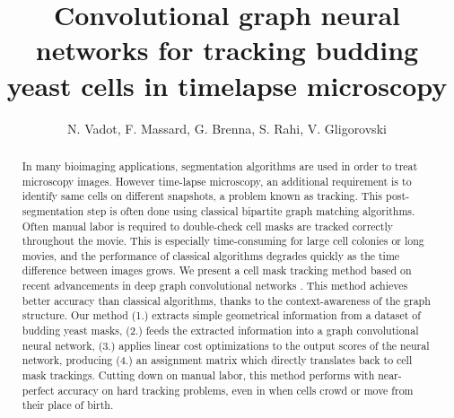 \documentclass[10pt,conference,compsocconf,a4paper]{IEEEtran}
\begin{document}
\title{Convolutional graph neural networks for tracking budding yeast cells in timelapse microscopy}

\author{
	N. Vadot, F. Massard, G. Brenna, S. Rahi, V. Gligorovski
}

\maketitle

\begin{abstract}
	In many bioimaging applications, segmentation algorithms are used in order to treat microscopy images.
	However time-lapse microscopy, an additional requirement is to identify same cells on different snapshots, a problem known as tracking.
	This post-segmentation step is often done using classical bipartite graph matching algorithms.
	Often manual labor is required to double-check cell masks are tracked correctly throughout the movie. This is especially time-consuming for large cell colonies or long movies, and the performance of classical algorithms degrades quickly as the time difference between images grows.
	We present a cell mask tracking method based on recent advancements in deep graph convolutional networks \cite{li_deepergcn_2020}. This method achieves better accuracy than classical algorithms, thanks to the context-awareness of the graph structure. Our method (1.) extracts simple geometrical information from a dataset of budding yeast masks, 
	(2.) feeds the extracted information into a graph convolutional neural network, 
	(3.) applies linear cost optimizations to the output scores of the neural network, producing 
	(4.) an assignment matrix which directly translates back to cell mask trackings.
	Cutting down on manual labor, this method performs with near-perfect accuracy on hard tracking problems, even in when cells crowd or move from their place of birth.
\end{abstract}
\end{document}
